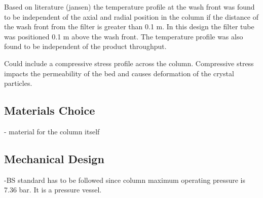 Based on literature (jansen) the temperature profile at the wash front was found to be independent of the axial and radial position in the column if the distance of the wash front from the filter is greater than 0.1 m. In this design the filter tube was positioned 0.1 m above the wash front. The temperature profile was also found to be independent of the product throughput. 

Could include a compressive stress profile across the column. Compressive stress impacts the permeability of the bed and causes deformation of the crystal particles.


\subsection{Materials Choice}
- material for the column itself 

\subsection{Mechanical Design}
-BS standard has to be followed since column maximum operating pressure is 7.36 bar. It is a pressure vessel.  
